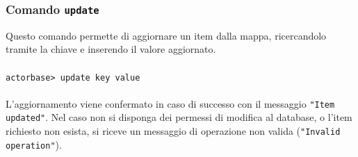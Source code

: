 \documentclass[a4paper]{article}
\begin{document}
	\subsubsection{Comando \texttt{update}}
	Questo comando permette di aggiornare un item dalla mappa, ricercandolo tramite la chiave e inserendo il valore aggiornato.
	\\ \\
	\texttt{actorbase>	update key value}
	\\ \\
	L'aggiornamento viene confermato in caso di successo con il messaggio \texttt{"Item updated"}. Nel caso non si disponga dei permessi di modifica al database, o l'item 
	richiesto non esista, si riceve un messaggio di operazione non valida (\texttt{"Invalid operation"}).
			
	\cleardoublepage
	\listoffigures
	
	\cleardoublepage
	\listoftables
		
\end{document}
